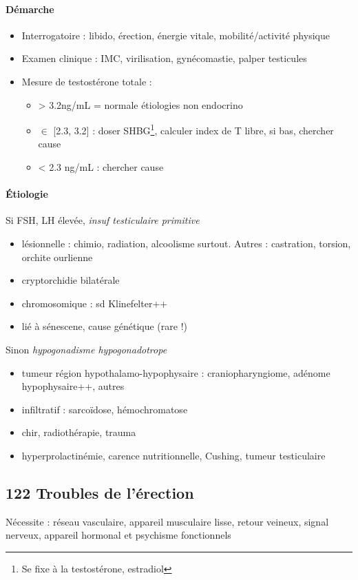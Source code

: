 \documentclass[11pt]{article}
\begin{document}
\paragraph{Démarche}
\label{sec:org8c955f3}
\begin{itemize}
\item Interrogatoire : libido, érection, énergie vitale, mobilité/activité physique
\item Examen clinique : IMC, virilisation, gynécomastie, palper testicules
\item Mesure de testostérone totale :
\begin{itemize}
\item > 3.2ng/mL = normale \thus étiologies non endocrino
\item \(\in\) [2.3, 3.2] : doser SHBG\footnote{Se fixe à la testostérone, estradiol}, calculer index de T libre, si bas, chercher cause
\item < 2.3 ng/mL : chercher cause
\end{itemize}
\end{itemize}
\paragraph{Étiologie}
\label{sec:orgff05c74}
Si FSH, LH élevée, \emph{insuf testiculaire primitive} 
\begin{itemize}
\item lésionnelle : chimio, radiation, alcoolisme surtout. Autres : castration,
torsion, orchite ourlienne
\item cryptorchidie bilatérale
\item chromosomique : sd Klinefelter++
\item lié à sénescene, cause génétique (rare !)
\end{itemize}
Sinon \emph{hypogonadisme hypogonadotrope}
\begin{itemize}
\item tumeur région hypothalamo-hypophysaire : craniopharyngiome, adénome
hypophysaire++, autres
\item infiltratif : sarcoïdose, hémochromatose
\item chir, radiothérapie, trauma
\item hyperprolactinémie, carence nutritionnelle, Cushing, tumeur testiculaire
\end{itemize}

\subsection{122 \textdagger{} Troubles de l'érection}
\label{sec:org62a1585}
Nécessite : réseau vasculaire, appareil musculaire lisse, retour veineux, signal  nerveux,
appareil hormonal et psychisme fonctionnels
\end{document}
